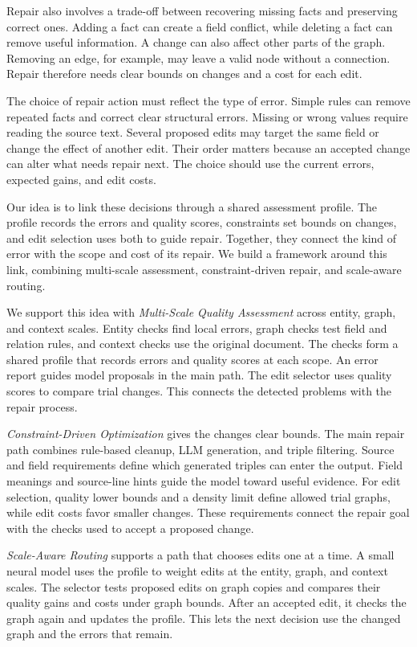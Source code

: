 Repair also involves a trade-off between recovering missing facts and
preserving correct ones.
Adding a fact can create a field conflict, while deleting a fact can
remove useful information.
A change can also affect other parts of the graph.
Removing an edge, for example, may leave a valid node without a connection.
Repair therefore needs clear bounds on changes and a cost for each edit.

The choice of repair action must reflect the type of error.
Simple rules can remove repeated facts and correct clear structural errors.
Missing or wrong values require reading the source text.
Several proposed edits may target the same field or change the effect
of another edit.
Their order matters because an accepted change can alter what needs repair next.
The choice should use the current errors, expected gains, and edit costs.

Our idea is to link these decisions through a shared assessment profile.
The profile records the errors and quality scores, constraints set bounds
on changes, and edit selection uses both to guide repair.
Together, they connect the kind of error with the scope and cost of its repair.
We build a framework around this link, combining multi-scale assessment,
constraint-driven repair, and scale-aware routing.

We support this idea with \emph{Multi-Scale Quality Assessment} across
entity, graph, and context scales.
Entity checks find local errors, graph checks test field and relation rules,
and context checks use the original document.
The checks form a shared profile that records errors and quality scores
at each scope.
An error report guides model proposals in the main path.
The edit selector uses quality scores to compare trial changes.
This connects the detected problems with the repair process.

\emph{Constraint-Driven Optimization} gives the changes clear bounds.
The main repair path combines rule-based cleanup, LLM generation, and
triple filtering.
Source and field requirements define which generated triples can enter
the output.
Field meanings and source-line hints guide the model toward useful evidence.
For edit selection, quality lower bounds and a density limit define
allowed trial graphs, while edit costs favor smaller changes.
These requirements connect the repair goal with the checks used to accept
a proposed change.

\emph{Scale-Aware Routing} supports a path that chooses edits one at a time.
A small neural model uses the profile to weight edits at the entity, graph,
and context scales.
The selector tests proposed edits on graph copies and compares their quality
gains and costs under graph bounds.
After an accepted edit, it checks the graph again and updates the profile.
This lets the next decision use the changed graph and the errors that remain.

